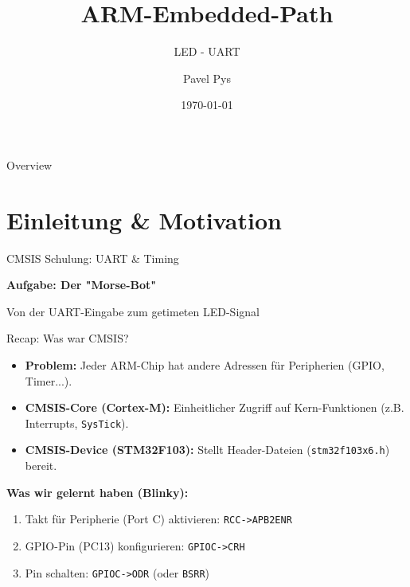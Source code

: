 \documentclass{beamer}
\title{ARM-Embedded-Path}
\subtitle{LED - UART}
\author{Pavel Pys}
\date{\today}
\begin{document}
\begin{frame}{}
	\maketitle
\end{frame}
\begin{frame}{Overview}
	\tableofcontents
\end{frame}

\section{Einleitung \& Motivation}

\begin{frame}{CMSIS Schulung: UART \& Timing}
	\begin{center}
		\Large\textbf{Aufgabe: Der "Morse-Bot"}
		\medskip
		
		\normalsize Von der UART-Eingabe zum getimeten LED-Signal
	\end{center}
\end{frame}
\begin{frame}{Recap: Was war CMSIS?}
	\begin{itemize}
		\item \textbf{Problem:} Jeder ARM-Chip hat andere Adressen für Peripherien (GPIO, Timer...).
		\item \textbf{CMSIS-Core (Cortex-M):} Einheitlicher Zugriff auf Kern-Funktionen (z.B. Interrupts, \texttt{SysTick}).
		\item \textbf{CMSIS-Device (STM32F103):} Stellt Header-Dateien (\texttt{stm32f103x6.h}) bereit.
	\end{itemize}
	
	\medskip
	\textbf{Was wir gelernt haben (Blinky):}
	\begin{enumerate}
		\item Takt für Peripherie (Port C) aktivieren: \texttt{RCC->APB2ENR}
		\item GPIO-Pin (PC13) konfigurieren: \texttt{GPIOC->CRH}
		\item Pin schalten: \texttt{GPIOC->ODR} (oder \texttt{BSRR})
	\end{enumerate}
\end{frame}
\end{document}
